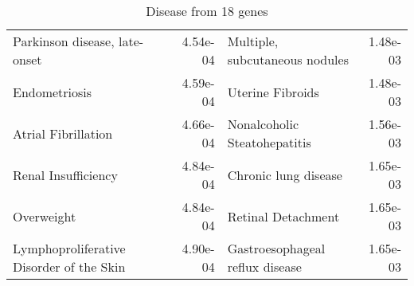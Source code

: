 \documentclass[fleqn,10pt]{SelfArx} %
\begin{document}
\begin{table}[ht]
\begin{tabularx}{\textwidth}{lRlR}
		Parkinson disease, late-onset & 4.54e-04 & Multiple, subcutaneous nodules & 1.48e-03 \\ 
		Endometriosis & 4.59e-04 & Uterine Fibroids & 1.48e-03 \\ 
		Atrial Fibrillation & 4.66e-04 & Nonalcoholic Steatohepatitis & 1.56e-03 \\ 
		Renal Insufficiency & 4.84e-04 & Chronic lung disease & 1.65e-03 \\ 
		Overweight & 4.84e-04 & Retinal Detachment & 1.65e-03 \\ 
		Lymphoproliferative Disorder of the Skin & 4.90e-04 & Gastroesophageal reflux disease & 1.65e-03 \\ 
	\end{tabularx}
	\smallskip
	\caption{Disease from 18 genes}
	\label{tab:diseases18}
\end{table}
\end{document}
